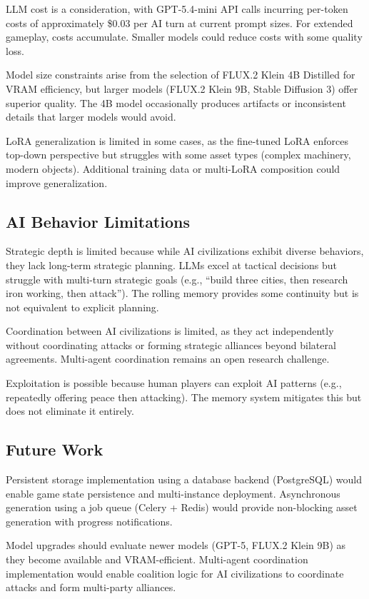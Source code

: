 \documentclass[conference]{IEEEtran}
\begin{document}
LLM cost is a consideration, with GPT-5.4-mini API calls incurring per-token costs of approximately \$0.03 per AI turn at current prompt sizes. For extended gameplay, costs accumulate. Smaller models could reduce costs with some quality loss.

Model size constraints arise from the selection of FLUX.2 Klein 4B Distilled for VRAM efficiency, but larger models (FLUX.2 Klein 9B, Stable Diffusion 3) offer superior quality. The 4B model occasionally produces artifacts or inconsistent details that larger models would avoid.

LoRA generalization is limited in some cases, as the fine-tuned LoRA enforces top-down perspective but struggles with some asset types (complex machinery, modern objects). Additional training data or multi-LoRA composition could improve generalization.

\subsection{AI Behavior Limitations}

Strategic depth is limited because while AI civilizations exhibit diverse behaviors, they lack long-term strategic planning. LLMs excel at tactical decisions but struggle with multi-turn strategic goals (e.g., ``build three cities, then research iron working, then attack''). The rolling memory provides some continuity but is not equivalent to explicit planning.

Coordination between AI civilizations is limited, as they act independently without coordinating attacks or forming strategic alliances beyond bilateral agreements. Multi-agent coordination remains an open research challenge.

Exploitation is possible because human players can exploit AI patterns (e.g., repeatedly offering peace then attacking). The memory system mitigates this but does not eliminate it entirely.

\subsection{Future Work}

Persistent storage implementation using a database backend (PostgreSQL) would enable game state persistence and multi-instance deployment. Asynchronous generation using a job queue (Celery + Redis) would provide non-blocking asset generation with progress notifications.

Model upgrades should evaluate newer models (GPT-5, FLUX.2 Klein 9B) as they become available and VRAM-efficient. Multi-agent coordination implementation would enable coalition logic for AI civilizations to coordinate attacks and form multi-party alliances.
\end{document}
